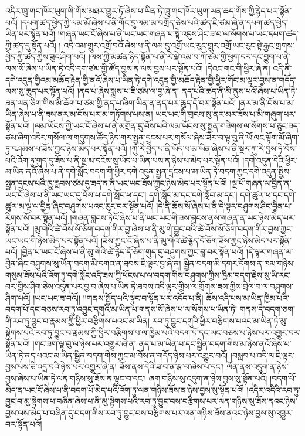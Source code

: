 འདིར་ཁྲུ་གང་ཁོར་ཡུག་གི་གོས་མཐར་གྱུར་ཏོ་ཞེས་པ་ཡིན་ཏེ་ཁྲུ་གང་ཁོར་ཡུག་ཡན་ཆད་གོས་ཀྱི་རྙེད་པར་སྟོན་པའོ། །དཔག་ཚད་ཕྱེད་ཀྱི་ལམ་མོ་ཞེས་པ་ནི་གོང་དུ་ལམ་མ་བགྲོད་ཅེས་པའི་ཚད་ཇི་ཙམ་ཞེ་ན་དཔག་ཚད་ཕྱེད་ཡིན་པར་སྟོན་པའོ། །གཞན་ཡང་ངོ་ཞེས་པ་ནི་ཡང་ཡང་གཞན་པ་སྟེ་འདུས་ཤིང་ཟ་བ་ལ་སོགས་པ་ཡང་དཔག་ཚད་ཀྱི་ཚད་དུ་སྟོན་པའོ། །
འདི་འམ་གྲུར་འགྲོ་བའོ་ཞེས་པ་ནི་ལམ་དུ་འགྲོ་ཡང་རུང་གྲུར་འགྲོ་ཡང་རུང་སྟེ་རྒྱང་གྲགས་ཕྱེད་ཀྱི་ཚད་ཀྱིས་ཟུང་ཤིག་པའོ། །ལས་ཀྱི་མཚན་ཉིད་སྟོན་པ་ནི་རེ་ལྡེ་འམ་བ་ཀོ་ཙམ་གྱི་ཕྱག་དར་དང་བྱུག་པ་ནི་ལས་སོ་ཞེས་པ་ཡིན་ཏེ་འདི་དག་ཙམ་གྱི་ཚོད་བྱས་ན་ལས་བྱས་པར་སྟོན་པའོ། །དེའང་གང་གི་ཕྱིར་ཞེ་ན། འདི་ནི་དགེ་འདུན་གྱིའམ་མཆོད་རྟེན་གྱི་ནའོ་ཞེས་པ་ཡིན་ཏེ་དགེ་འདུན་གྱི་མཆོད་རྟེན་གྱི་ཕྱིར་གོང་མ་ལྟར་བྱས་ན་གདོད་ལས་སུ་ཆུད་པར་སྟོན་པའོ། །ནད་པ་ཞེས་སྨྲས་པ་ཇི་ཙམ་ལ་བྱ་ཞེ་ན། ནད་པའི་ཚད་ནི་མི་ནུས་པའོ་ཞེས་པ་ཡིན་ཏེ་ཟན་ལན་ཅིག་གིས་མི་ཆོག་པ་ཙམ་གྱི་ནད་པ་ཞིག་ཡིན་ན་ནད་པར་ཆུད་དོ་བར་སྟོན་པའོ། །ནར་མ་ནི་བོས་པ་མ་ཡིན་ཞེས་པ་ནི་ཟས་ནར་མ་བོས་པར་མ་གཏོགས་པས་ན། ཡང་ཡང་གི་གྲངས་སུ་ནར་མར་ཟོས་པ་མི་གཞུག་པར་སྟོན་པའོ། །ལམ་ཡོངས་ཀྱི་ཡང་ངོ་ཞེས་པ་ནི་མགྲོན་དུ་བོས་པའི་ལམ་ཡོངས་སུ་སྤྱན་གཟིགས་ལ་སོགས་པ་ཅུང་ཟད་ཙམ་ཞིག་འདིར་གསོལ་ལ་གདུགས་ཚོད་ཉིད་གར་སྤྱན་དྲངས་པར་གསོལ་ཞེས་ཟེར་བ་ལྟ་བུ་ནི་ཡོ་ལང་ལྟོག་མོ་ཞིག་ཏུ་བཤམས་པ་ཟོས་ཀྱང་ཉེས་མེད་པར་སྟོན་པའོ། །ཀུ་རེ་བྱེད་པ་ནི་ཡོད་པ་མ་ཡིན་ཞེས་པ་ནི་སྔར་ཀུ་རེ་བྱས་ཏེ་བོས་པའི་འོག་ཏུ་གུད་དུ་ཟོས་པ་ནི་སྔ་མ་དངོས་སུ་ཡོད་པ་ཡིན་པས་ན་ཉེས་པ་མེད་པར་སྟོན་པའོ། །དགེ་འདུན་དེའི་ཕྱིར་མ་ཡིན་ནའོ་ཞེས་པ་ནི་དགེ་སློང་བདག་གི་ཕྱིར་དགེ་འདུན་སྤྱན་དྲངས་པ་མ་ཡིན་ཏེ་བདག་ཀྱང་དགེ་འདུན་སྤྱིས་སྤྱན་དྲངས་པའི་ཁྱུ་རླབས་ཙམ་དུ་ཟད་ན་ནི་ཡང་ཡང་ཟོས་ཀྱང་ཉེས་མེད་པར་སྟོན་པའོ། །ལྔ་པོ་གཞན་ལ་བྱིན་ན་ཡང་ངོ་ཞེས་པ་ནི་ཡང་ཡང་དུ་བོས་པ་དགེ་སློང་ཕ་དང་། དགེ་སློང་མ་དང་དགེ་སློབ་མ་དང་། དགེ་ཚུལ་ཕ་དང་དགེ་ཚུལ་མ་ལྔ་ལ་བྱིན་ཞིང་བཤུགས་པའང་རུང་བར་སྟོན་པའོ། །དེ་ནི་ཆོས་སོ་ཞེས་པ་ནི་དེ་ལྟར་བཤུགས་ཤིང་བྱིན་པ་རིགས་སོ་བར་སྟོན་པའོ། །གཞན་བླངས་ཏེའོ་ཞེས་པ་ནི་ཡང་ཡང་གི་ཟས་བླངས་ནས་གཞན་ན་ཡང་ཉེས་མེད་པར་སྟོན་པའོ། །མུ་གེའི་ཚེ་བོས་སོ་ཅོག་བདག་གིར་བྱ་ཞེས་པ་ནི་མུ་གེ་བྱུང་བའི་ཚེ་བོས་སོ་ཅོག་བདག་གིར་བྱས་ཀྱང་ཡང་ཡང་གི་ཉེས་མེད་པར་སྟོན་པའོ། །ཟོས་ཀྱང་ངོ་ཞེས་པ་ནི་མུ་གེའི་ཚེ་རྙེད་དོ་ཅོག་ཟོས་ཀྱང་ཉེས་མེད་པར་སྟོན་པའོ། །བྱིན་པ་ཡང་ངོ་ཞེས་པ་ནི་མུ་གེའི་ཚེ་རྙེད་དོ་ཅོག་གུད་དུ་བཤུགས་ཀྱང་བླ་བར་སྟོན་པའོ། །དེ་ལྟར་གཞན་ལ་བྱིན་ཞིང་བཤུགས་སུ་ཡོན་བདག་མི་དགའ་ན་ཐབས་ཇི་ལྟར་བྱ་ཞེ་ན། སྦྱིན་བདག་མི་དགར་དོགས་ན་ཁམ་གཉིས་གསུམ་ཟོས་པའི་འོག་ཏུ་དགེ་སློང་འདི་ཟས་ཀྱི་ཕོངས་པ་ལ་བདག་གིས་བཤུགས་ཀྱིས་ཁྱིམ་བདག་རྗེས་སུ་ཡི་རང་བར་གྱིས་ཤིག་ཅེས་འདུན་པར་བྱ་བ་ཞེས་པ་ཡིན་ཏེ་ཐབས་འདི་ལྟར་གྱིས་ལ་གྲོགས་ཟས་ཀྱིས་བྲེལ་བ་ལ་བཤུགས་ཤིག་པའོ། །ཡང་ཡང་ཟ་བའོ།། །།གནས་སྤྱོད་པའི་ལྟུང་བ་སྟོན་པར་འདོད་པ་ནི། ཆོས་འདི་པས་མ་ཡིན་ཁྱིམ་པའི་བདག་པོ་དང་བཅས་རབ་ཏུ་འབྱུང་དགུའི་མ་ཡིན་པ་གནས་སོ་ཞེས་པ་ལ་སོགས་པ་ཡིན་ཏེ། གནས་དེ་བདག་ཅག་གི་རབ་ཏུ་བྱུང་བ་རྣམས་ཀྱི་ཕྱིར་བརྩིགས་པའང་མ་ཡིན། རབ་ཏུ་བྱུང་དགུའི་ཕྱིར་བརྩིགས་པའང་མ་ཡིན་ཏེ་མུ་སྟེགས་པའི་རབ་ཏུ་བྱུང་བ་རྣམས་ཀྱི་ཕྱིར་བརྩིགས་པ་ལ་ཁྱིམ་པའི་བདག་པོ་དང་ཡང་བཅས་པ་ཉེས་པར་འགྱུར་བར་སྟོན་པའོ། །གང་ཟག་ལྟ་བུ་ལ་ཉེས་པར་འགྱུར་ཞེ་ན། ནད་པ་མ་ཡིན་པ་དང་སྦྱིན་བདག་གིས་མ་ཉེས་ནའོ་ཞེས་པ་ཡིན་ཏེ་ནད་པའང་མ་ཡིན་སྦྱིན་བདག་གིས་ཀྱང་མ་བོས་ན་གདོད་ཉེས་པར་འགྱུར་བའོ། །བསླབ་པ་འདི་ལ་ཇི་ལྟར་བྱས་པས་ཅི་འདྲ་བའི་ཉེས་པར་འགྱུར་ཞེ་ན། ཟོས་ནས་དེའི་ཟ་བ་ན་རྩ་བ་ཞེས་པ་དང་། ལོན་ནས་འདུག་ན་ཉེས་བྱས་ཞེས་པ་ཡིན་ཏེ་ལན་གཉིས་སུ་ཟོས་ན་ལྟུང་བ་དང་། ཞག་གཉིས་སུ་འདུག་ན་ཉེས་བྱས་སུ་སྟོན་པའོ། །བདག་པོ་མེད་ན་ཡང་ངོ་ཞེས་པ་ནི་བདག་པོ་མེད་པའི་འོག་ཏུ་ལན་གཉིས་ཟོས་ན་ཉེས་བྱས་སུ་སྟོན་པའོ། །འདིར་འདིའི་རབ་ཏུ་བྱུང་བ་མུ་སྟེགས་པ་བཞིན་ཞེས་པ་ནི་མུ་སྟེགས་པའི་རབ་ཏུ་བྱུང་བས་བརྩིགས་པར་ལན་གཉིས་སུ་ཟོས་ནའང་ཉེས་བྱས་ལས་མེད་པ་བཞིན་དུ་བདག་གིས་རབ་ཏུ་བྱུང་བས་བརྩིགས་པར་ལན་གཉིས་ཟོས་ནའང་ཉེས་བྱས་སུ་འགྱུར་བར་སྟོན་པའོ། 